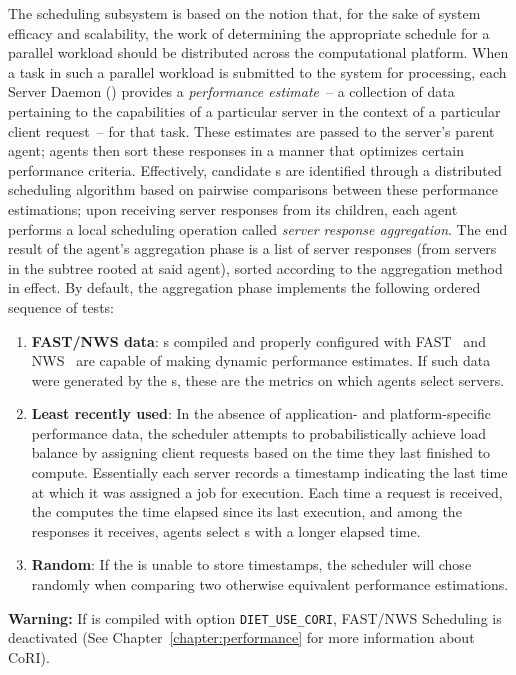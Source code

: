 The \diet scheduling subsystem is based on the notion that, for the sake of
system efficacy and scalability, the work of determining the appropriate
schedule for a parallel workload should be distributed across the computational
platform.  When a task in such a parallel workload is submitted to the system
for processing, each Server Daemon (\sed) provides a \emph{performance
  estimate}~-- a collection of data pertaining to the capabilities of a
particular server in the context of a particular client request~-- for that
task.  These estimates are passed to the server's parent agent; agents then
sort these responses in a manner that optimizes certain performance criteria.
Effectively, candidate {\sed}s are identified through a distributed scheduling
algorithm based on pairwise comparisons between these performance estimations;
upon receiving server responses from its children, each agent performs a local
scheduling operation called \emph{server response aggregation}.  The end result
of the agent's aggregation phase is a list of server responses (from servers in
the subtree rooted at said agent), sorted according to the aggregation method
in effect. By default, the aggregation phase implements the following ordered
sequence of tests:

\begin{enumerate}
\item \textbf{FAST/NWS data}: {\sed}s compiled and properly configured with
  FAST~\cite{Qui02} and NWS~\cite{WSH99} are capable of making dynamic
  performance estimates.  If such data were generated by the {\sed}s, these are
  the metrics on which agents select servers.
\item \textbf{Least recently used}: In the absence of application- and
  platform-specific performance data, the \diet scheduler attempts to
  probabilistically achieve load balance by assigning client requests based on
  the time they last finished to compute.  Essentially each server records a
  timestamp indicating the last time at which it was assigned a job for
  execution.  Each time a request is received, the \sed computes the time elapsed
  since its last execution, and among the responses it receives, \diet agents
  select {\sed}s with a longer elapsed time.
\item \textbf{Random}: If the {\sed} is unable to store timestamps, the \diet
  scheduler will chose randomly when comparing two otherwise equivalent {\sed}
  performance estimations.
\end{enumerate}

\textbf{Warning:} If \diet is compiled with option \texttt{DIET\_USE\_CORI},
FAST/NWS Scheduling is deactivated (See Chapter~\ref{chapter:performance} for
more information about CoRI).

